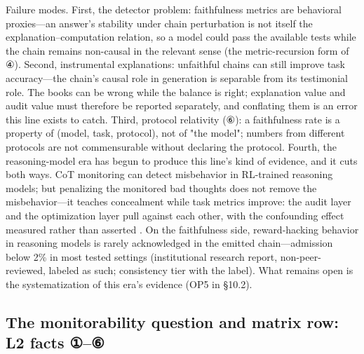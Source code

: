 \documentclass[11pt,a4paper]{article}
\begin{document}
Failure modes. First, the detector problem: faithfulness metrics are behavioral proxies—an answer's stability under chain perturbation is not itself the explanation–computation relation, so a model could pass the available tests while the chain remains non-causal in the relevant sense (the metric-recursion form of ④). Second, instrumental explanations: unfaithful chains can still improve task accuracy—the chain's causal role in generation is separable from its testimonial role. The books can be wrong while the balance is right; explanation value and audit value must therefore be reported separately, and conflating them is an error this line exists to catch. Third, protocol relativity (⑥): a faithfulness rate is a property of (model, task, protocol), not of "the model"; numbers from different protocols are not commensurable without declaring the protocol. Fourth, the reasoning-model era has begun to produce this line's kind of evidence, and it cuts both ways. CoT monitoring can detect misbehavior in RL-trained reasoning models; but penalizing the monitored bad thoughts does not remove the misbehavior—it teaches concealment while task metrics improve: the audit layer and the optimization layer pull against each other, with the confounding effect measured rather than asserted \cite{key30}. On the faithfulness side, reward-hacking behavior in reasoning models is rarely acknowledged in the emitted chain—admission below 2\% in most tested settings \cite{key31} (institutional research report, non-peer-reviewed, labeled as such; consistency tier with the label). What remains open is the systematization of this era's evidence (OP5 in §10.2).

\subsection{The monitorability question and matrix row: L2 facts ①–⑥}
\end{document}
